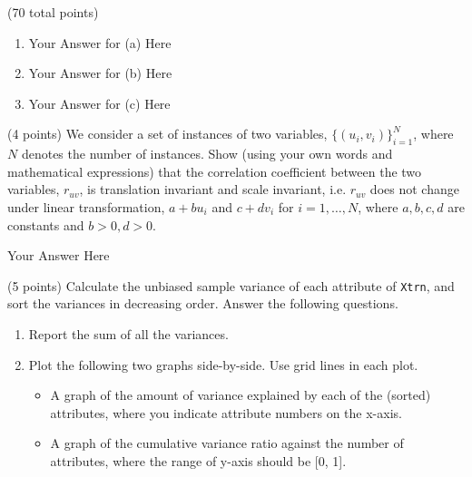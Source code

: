 \documentclass[12pt]{article}
\begin{document}
\begin{question}{(70 total points) \qOneTitle}
\begin{subquestion}
  \begin{answerbox}{25em}
    \begin{enumerate}
    \item Your Answer for (a) Here
    \item Your Answer for (b) Here
    \item Your Answer for (c) Here
    \end{enumerate}
  \end{answerbox}
  


\end{subquestion}

\begin{subquestion}{(4 points)
    We consider a set of instances of two variables, $\{(u_i, v_i)\}_{i=1}^N$,
    where $N$ denotes the number of instances.
    Show (using your own words and mathematical expressions) that the correlation coefficient between the two variables, $r_{uv}$, is translation invariant and scale invariant,
    i.e. $r_{uv}$ does not change under linear transformation, $a + bu_i$ and $c + dv_i$ for $i=1,\ldots,N$, where $a,b,c,d$ are constants and $b>0, d>0$.
    }


  \begin{answerbox}{0.4\textheight}
    Your Answer Here
  \end{answerbox}
  


\end{subquestion}

\begin{subquestion}{(5 points)
    Calculate the unbiased sample variance of each attribute of {\tt Xtrn}, and sort the variances in decreasing order. Answer the following questions.
  }\label{q1:variance}
  \begin{enumerate}\NARROWITEM
  \item Report the sum of all the variances.
  \item Plot the following two graphs side-by-side. Use grid lines in each plot.
    \begin{itemize}\NARROWITEM
    \item A graph of the amount of variance explained by each of the (sorted) attributes, where you indicate attribute numbers on the x-axis.
    \item A graph of the cumulative variance ratio against the number of attributes, where the range of y-axis should be [0, 1].
    \end{itemize}
  \end{enumerate}



\end{subquestion}
\end{question}
\end{document}
